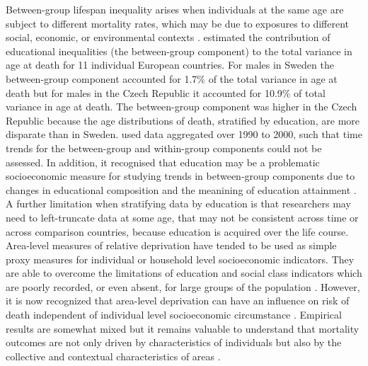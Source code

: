 \documentclass[12pt,oneside,a4paper]{article} %
\theoremstyle{definition}
\begin{document}
Between-group lifespan inequality arises when individuals at the same age are
subject to different mortality rates, which may be due to exposures to
different social, economic, or environmental contexts \citep{Hartemink2017}.
\citet{Raalte2012} estimated the contribution of educational inequalities (the
between-group component) to the total variance in age at death for 11 individual European countries. For males in Sweden the between-group component accounted for 1.7\% of the total variance in age at death but for males in the Czech Republic it accounted for 10.9\% of total variance in age at death. The between-group component was higher in the Czech Republic because the age distributions of death, stratified by education, are more disparate than in Sweden. 
\citet{Raalte2012} used data aggregated over 1990 to 2000, such
that time trends for the between-group and within-group components could not be assessed. 
In addition, it recognised that education may be a problematic socioeconomic
measure for studying trends in between-group components due to
changes in educational composition and the meanining of education attainment
\citep{Raalte2012,Hendi2015}.
A further limitation when stratifying data by education is that researchers
may need to left-truncate data at some age, that may not be consistent across time or across comparison countries, because education is acquired
over the life course. 
Area-level measures of relative deprivation have tended to be used as simple proxy measures for individual or household level socioeconomic indicators. They are able to overcome the limitations of education and social class indicators which are poorly recorded, or even absent, for large groups of the population \citep{Morgan2006}.  However, it is now recognized that area-level deprivation can have an influence on risk of death independent of individual level socioeconomic circumstance \citep{Carstairs1989,Macintyre2002,Tunstall2011}. Empirical results are somewhat mixed but it remains valuable to understand that mortality outcomes are not only driven by characteristics of individuals but also by the collective and contextual characteristics of areas \citep{Macintyre2002}. 
\end{document}
